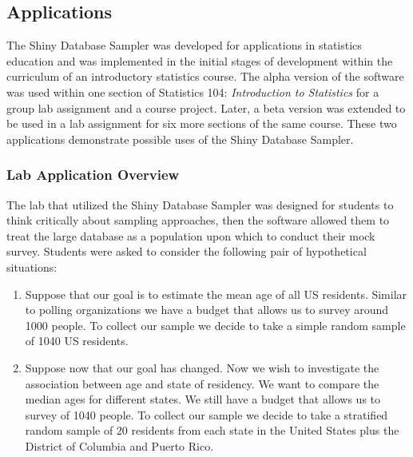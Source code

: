 \documentclass[11pt]{isuthesis}\usepackage[]{graphicx}\usepackage[]{color}
\begin{document}
\subsection{Applications}
\label{Applications}

The Shiny Database Sampler was developed for applications in statistics education and was implemented in the initial stages of development within the curriculum of an introductory statistics course. The alpha version of the software was used within one section of Statistics 104: \textit{Introduction to Statistics} for a group lab assignment and a course project. Later, a beta version was extended to be used in a lab assignment for six more sections of the same course. These two applications demonstrate possible uses of the Shiny Database Sampler. 

 \subsubsection{Lab Application Overview} 
 \label{LabOverview}

The lab that utilized the Shiny Database Sampler was designed for students to think critically about sampling approaches, then the software allowed them to treat the large database as a population upon which to conduct their mock survey. Students were asked to consider the following pair of hypothetical situations:

\begin{enumerate}
\item Suppose that our goal is to estimate the mean age of all US residents. Similar to polling organizations we have a budget that allows us to survey around 1000 people. To collect our sample we decide to take a simple random sample of 1040 US residents.

\item Suppose now that our goal has changed.  Now we wish to investigate the association between age and state of residency. We want to compare the median ages for different states. We still have a budget that allows us to survey of 1040 people. To collect our sample we decide to take a stratified random sample of 20 residents from each state in the United States plus the District of Columbia and Puerto Rico. 
\end{enumerate}
\end{document}
